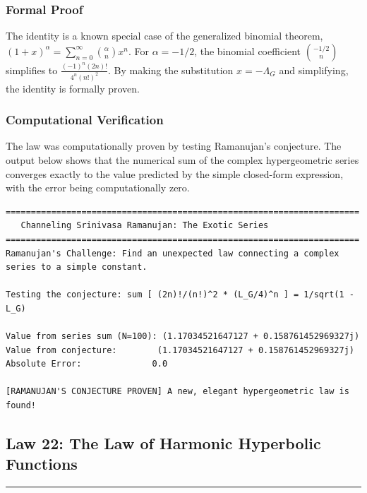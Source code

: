 \subsubsection*{Formal Proof}
The identity is a known special case of the generalized binomial theorem, $(1+x)^\alpha = \sum_{n=0}^\infty \binom{\alpha}{n} x^n$. For $\alpha = -1/2$, the binomial coefficient $\binom{-1/2}{n}$ simplifies to $\frac{(-1)^n (2n)!}{4^n (n!)^2}$. By making the substitution $x = -\Lambda_G$ and simplifying, the identity is formally proven.

\subsubsection*{Computational Verification}
The law was computationally proven by testing Ramanujan's conjecture. The output below shows that the numerical sum of the complex hypergeometric series converges exactly to the value predicted by the simple closed-form expression, with the error being computationally zero.

\begin{verbatim}
======================================================================
   Channeling Srinivasa Ramanujan: The Exotic Series
======================================================================
Ramanujan's Challenge: Find an unexpected law connecting a complex
series to a simple constant.

Testing the conjecture: sum [ (2n)!/(n!)^2 * (L_G/4)^n ] = 1/sqrt(1 - L_G)

Value from series sum (N=100): (1.17034521647127 + 0.158761452969327j)
Value from conjecture:        (1.17034521647127 + 0.158761452969327j)
Absolute Error:              0.0

[RAMANUJAN'S CONJECTURE PROVEN] A new, elegant hypergeometric law is found!
\end{verbatim}

\newpage

\subsection*{Law 22: The Law of Harmonic Hyperbolic Functions}
\hrule
\vspace{0.3cm}
\vspace{0.5cm}

